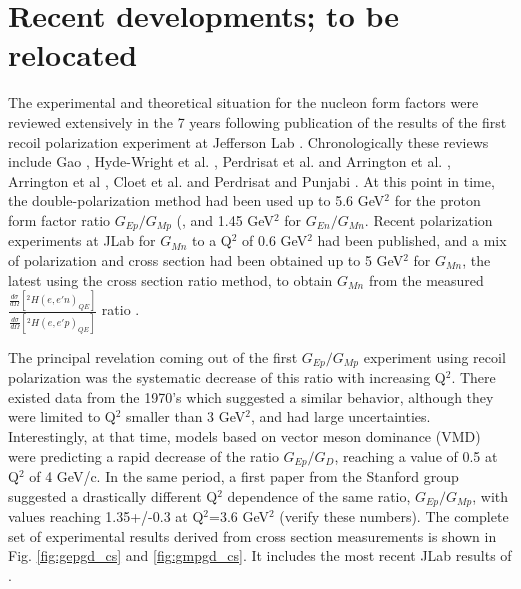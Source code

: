 \section{Recent developments; to be relocated}

The experimental and theoretical situation for the nucleon form factors were reviewed extensively in the 7 years following
publication of the results of the first recoil polarization experiment at Jefferson Lab \cite{jones}. Chronologically
these reviews include Gao \cite{gao}, Hyde-Wright et al. \cite{charleskees}, Perdrisat et al. \cite{perdrisat:2006} and 
Arrington et al. \cite{arrreview}, Arrington et al \cite{arrington:2011}, Cloet et al. \cite{cloet:2008}
and Perdrisat and Punjabi \cite{scholar}. At this point in time, the double-polarization method had been used up to 5.6 GeV$^2$
for the proton form factor ratio $G_{Ep}/G_{Mp}$ (\cite{jones,punjabi05,gayou:2001}, and 1.45 GeV$^2$ for $G_{En}/G_{Mn}$. 
Recent polarization experiments at JLab for $G_{Mn}$ to a Q$^2$ of 0.6 GeV$^2$ \cite{anderson} had been published, and a 
mix of polarization and cross section had been obtained up to 5 GeV$^2$ for $G_{Mn}$, the latest  using the cross section
ratio method, to obtain $G_{Mn}$ from the measured 
${\frac{\frac{d\sigma}{d\Omega}[^2H(e,e'n)_{QE}]}{\frac{d\sigma}{d\Omega}[^2H(e,e'p)_{QE}]}}$ ratio \cite{brooks}.

The principal revelation coming out of the first $G_{Ep}/G_{Mp}$ experiment using recoil polarization was the systematic
decrease of this ratio with increasing Q$^2$. There existed data from the 1970's which suggested a similar behavior, 
although they were limited to Q$^2$ smaller than 3 GeV$^2$, and had large uncertainties. Interestingly, at that time, 
models based on vector meson dominance (VMD) \cite{iachello,hohler,gari} were predicting a rapid decrease of the ratio
 $G_{Ep}/G_D$, reaching a value of 0.5 at Q$^2$ of 4 GeV/c. In the same period, a first paper from the Stanford group
\cite{litt} suggested a drastically different Q$^2$ dependence of the same ratio, $G_{Ep}/G_{Mp}$, with values reaching
1.35+/-0.3 at Q$^2$=3.6 GeV$^2$ (verify these numbers). The complete set of experimental results derived from cross 
section measurements is shown in Fig. \ref{fig:gepgd_cs} and \ref{fig:gmpgd_cs}. It includes the most recent JLab results
 of \cite{christy,qattan05}.


